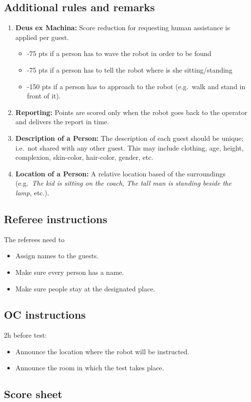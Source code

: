 \subsection*{Additional rules and remarks}
\begin{enumerate}[nosep]
	\item \textbf{Deus ex Machina:} Score reduction for requesting human assistance is applied per guest.
	\begin{itemize}
		\item -75 pts if a person has to wave the robot in order to be found
		\item -75 pts if a person has to tell the robot where is she sitting/standing
		\item -150 pts if a person has to approach to the robot (e.g.~walk and stand in front of it).
	\end{itemize}

	\item \textbf{Reporting:} Points are scored only when the robot goes back to the operator and delivers the report in time.

	\item \textbf{Description of a Person:} The description of each guest should be unique; i.e.~not shared with any other guest. This may include clothing, age, height, complexion, skin-color, hair-color, gender, etc.

	\item \textbf{Location of a Person:} A relative location based of the surroundings (e.g.~\textit{The kid is sitting on the coach}, \textit{The tall man is standing beside the lamp}, etc.).
\end{enumerate}


\subsection*{Referee instructions}

The referees need to
\begin{itemize}
	\item Assign names to the guests.
	\item Make sure every person has a name.
	\item Make sure people stay at the designated place.
\end{itemize}

\subsection*{OC instructions}

2h before test:
\begin{itemize}
	\item Announce the location where the robot will be instructed.
	\item Announce the room in which the test takes place.
\end{itemize}

\subsection*{Score sheet}

